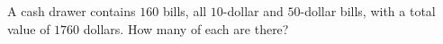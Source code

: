 A cash drawer contains $160$ bills, all $10$-dollar and $50$-dollar bills, with a total value of $1760$ dollars. How many of each are there?
